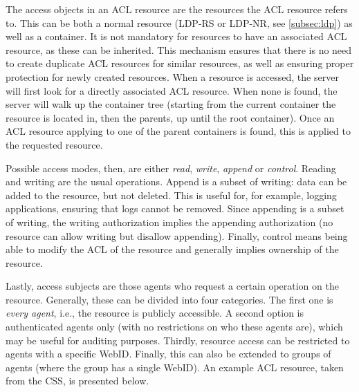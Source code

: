 The access objects in an \gls{ACL} resource are the resources the \gls{ACL} resource refers to. This can be both a normal resource (LDP-RS or LDP-NR, see \ref{subsec:ldp}) as well as a container. It is not mandatory for resources to have an associated \gls{ACL} resource, as these can be inherited. This mechanism ensures that there is no need to create duplicate \gls{ACL} resources for similar resources, as well as ensuring proper protection for newly created resources. When a resource is accessed, the server will first look for a directly associated \gls{ACL} resource. When none is found, the server will walk up the container tree (starting from the current container the resource is located in, then the parents, up until the root container). Once an \gls{ACL} resource applying to one of the parent containers is found, this is applied to the requested resource.

Possible access modes, then, are either \textit{read}, \textit{write}, \textit{append} or \textit{control}. Reading and writing are the usual operations. Append is a subset of writing: data can be added to the resource, but not deleted. This is useful for, for example, logging applications, ensuring that logs cannot be removed. Since appending is a subset of writing, the writing authorization implies the appending authorization (no resource can allow writing but disallow appending). Finally, control means being able to modify the \gls{ACL} of the resource and generally implies ownership of the resource.

Lastly, access subjects are those agents who request a certain operation on the resource. Generally, these can be divided into four categories. The first one is \textit{every agent}, i.e., the resource is publicly accessible. A second option is authenticated agents only (with no restrictions on who these agents are), which may be useful for auditing purposes. Thirdly, resource access can be restricted to agents with a specific WebID. Finally, this can also be extended to groups of agents (where the group has a single WebID). An example \gls{ACL} resource, taken from the \acrlong{CSS}, is presented below.

\newpage
{}

